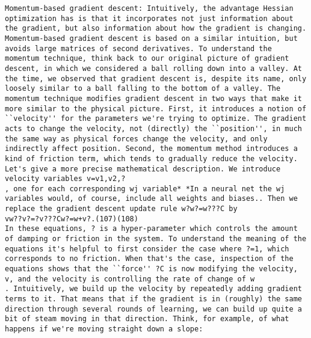 \begin{lstlisting}
Momentum-based gradient descent: Intuitively, the advantage Hessian optimization has is that it incorporates not just information about the gradient, but also information about how the gradient is changing. Momentum-based gradient descent is based on a similar intuition, but avoids large matrices of second derivatives. To understand the momentum technique, think back to our original picture of gradient descent, in which we considered a ball rolling down into a valley. At the time, we observed that gradient descent is, despite its name, only loosely similar to a ball falling to the bottom of a valley. The momentum technique modifies gradient descent in two ways that make it more similar to the physical picture. First, it introduces a notion of ``velocity'' for the parameters we're trying to optimize. The gradient acts to change the velocity, not (directly) the ``position'', in much the same way as physical forces change the velocity, and only indirectly affect position. Second, the momentum method introduces a kind of friction term, which tends to gradually reduce the velocity.
Let's give a more precise mathematical description. We introduce velocity variables v=v1,v2,?
, one for each corresponding wj variable* *In a neural net the wj variables would, of course, include all weights and biases.. Then we replace the gradient descent update rule w?w?=w???C by 
vw??v?=?v???Cw?=w+v?.(107)(108)
In these equations, ? is a hyper-parameter which controls the amount of damping or friction in the system. To understand the meaning of the equations it's helpful to first consider the case where ?=1, which corresponds to no friction. When that's the case, inspection of the equations shows that the ``force'' ?C is now modifying the velocity, v, and the velocity is controlling the rate of change of w
. Intuitively, we build up the velocity by repeatedly adding gradient terms to it. That means that if the gradient is in (roughly) the same direction through several rounds of learning, we can build up quite a bit of steam moving in that direction. Think, for example, of what happens if we're moving straight down a slope:


\end{lstlisting}
